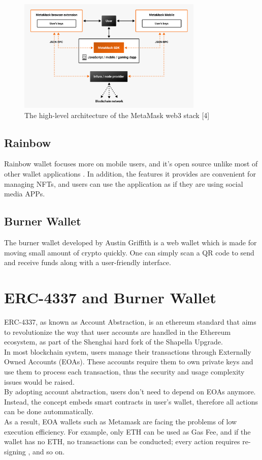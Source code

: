 \documentclass[conference]{IEEEtran}
\begin{document}
\begin{figure}[htbp]
    \centerline{\includegraphics[width=250pt]{web3-architecture-692705a57011e90a523806281fdf2219.png}}\label{fig}
    \caption{The high-level architecture of the MetaMask web3 stack [4]}
    \end{figure}

\subsection{Rainbow}
Rainbow wallet focuses more on mobile users, and it's open source unlike most of other wallet applications
. In addition, the features it provides are convenient for managing NFTs, and users can use the application 
as if they are using social media APPs.

\subsection{Burner Wallet}\label{SCM}
The burner wallet developed by Austin Griffith is a web wallet which is made for moving small amount of 
crypto quickly. One can simply scan a QR code to send and receive funds along with a user-friendly interface.

\section{ERC-4337 and Burner Wallet}

ERC-4337, as known as Account Abstraction, is an ethereum standard that aims to revolutionize the way that 
user accounts are handled in the Ethereum ecosystem, as part of the Shenghai hard fork of the Shapella Upgrade.\\
In most blockchain system, users manage their transactions through Externally Owned Accounts (EOAs). These accounts
require them to own private keys and use them to process each transaction, thus the security and usage complexity 
issues would be raised. \\
By adopting account abstraction, users don't need to depend on EOAs anymore. Instead, the concept embeds smart 
contracts in user's wallet, therefore all actions can be done autommatically.\\
As a result, EOA wallets such as Metamask are facing the problems of low execution efficiency. For example, only ETH
can be used as Gas Fee, and if the wallet has no ETH, no transactions can be conducted; every action requires re-signing
, and so on.\\
\end{document}
